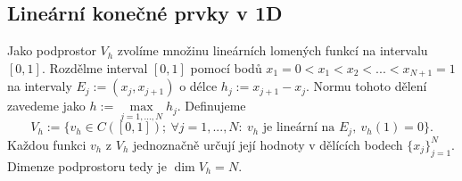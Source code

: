 \subsection{Lineární konečné prvky v 1D}
Jako podprostor $V_h$ zvolíme množinu lineárních lomených funkcí na intervalu $[0,1]$.
Rozdělme interval $[0,1]$ pomocí bodů $x_1=0<x_1<x_2<...<x_{N+1}=1$ na intervaly $E_j:=(x_j,x_{j+1})$ o délce $h_j:=x_{j+1}-x_{j}$.
Normu tohoto dělení zavedeme jako $h:=\max\limits_{j=1,...,N} h_j$.
Definujeme
\[ V_h:=\{v_h\in C([0,1]);~\forall j=1,...,N:~v_h \mbox{ je lineární na }E_j,~v_h(1)=0 \}. \]
Každou funkci $v_h$ z $V_h$ jednoznačně určují její hodnoty v dělících bodech $\{x_j\}_{j=1}^N$.
Dimenze podprostoru tedy je $\dim V_h=N$.

